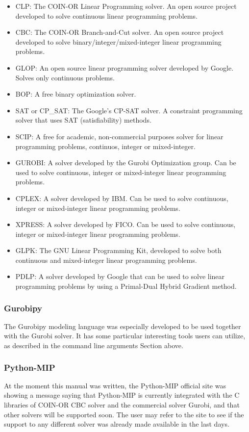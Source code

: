 \documentclass[12pt,hidelinks]{article}
\begin{document}
		\begin{itemize}
			\item CLP: The COIN-OR Linear Programming solver. An open source project developed to solve continuous linear programming problems.
			\item CBC: The COIN-OR Branch-and-Cut solver. An open source project developed to solve binary/integer/mixed-integer linear programming problems.
			\item GLOP: An open source linear programming solver developed by Google. Solves only continuous problems.
			\item BOP: A free binary optimization solver.
			\item SAT or CP\_SAT: The Google's CP-SAT solver. A constraint programming solver that uses SAT (satisfiability) methods.
			\item SCIP: A free for academic, non-commercial purposes solver for linear programming problems, continuos, integer or mixed-integer.
			\item GUROBI: A solver developed by the Gurobi Optimization group. Can be used to solve continuous, integer or mixed-integer linear programming problems.
			\item CPLEX: A solver developed by IBM. Can be used to solve continuous, integer or mixed-integer linear programming problems.
			\item XPRESS: A solver developed by FICO. Can be used to solve continuous, integer or mixed-integer linear programming problems.
			\item GLPK: The GNU Linear Programming Kit, developed to solve both continuous and mixed-integer linear programming problems.
			\item PDLP: A solver developed by Google that can be used to solve linear programming problems by using a Primal-Dual Hybrid Gradient method.
		\end{itemize}

	\subsubsection{Gurobipy}

		The Gurobipy modeling language was especially developed to be used together with the Gurobi solver. It has some particular interesting tools users can utilize, as described in the command line arguments Section above.

	\subsubsection{Python-MIP}

		At the moment this manual was written, the Python-MIP official site was showing a message saying that Python-MIP is currently integrated with the C libraries of COIN-OR CBC solver and the commercial solver Gurobi, and that other solvers will be supported soon. The user may refer to the site to see if the support to any different solver was already made available in the last days. 

\newpage
\end{document}
